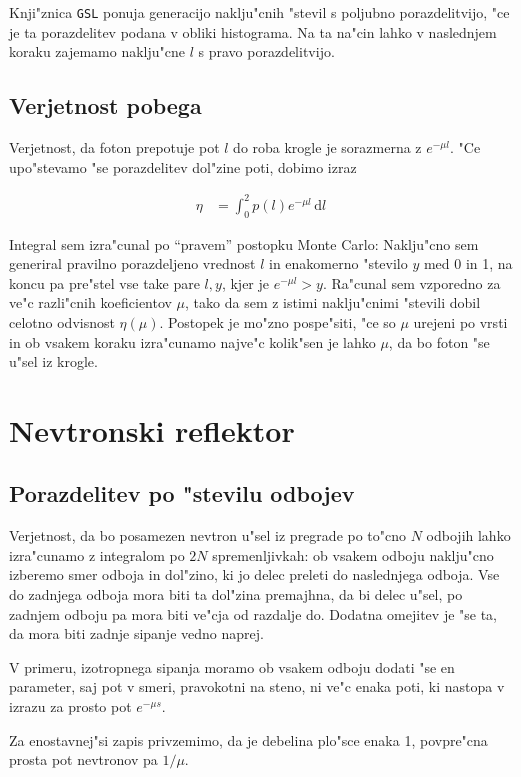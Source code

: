 \documentclass[a4paper,10pt]{article}
\newcommand{\dd}{\,\mathrm{d}}
\begin{document}
Knji"znica \texttt{GSL} ponuja generacijo naklju"cnih "stevil s poljubno porazdelitvijo, "ce je ta porazdelitev podana v obliki histograma. Na ta na"cin lahko v naslednjem koraku zajemamo naklju"cne $l$ s pravo porazdelitvijo. 

\subsection{Verjetnost pobega}
Verjetnost, da foton prepotuje pot $l$ do roba krogle je sorazmerna z $e^{-\mu l}$. "Ce upo"stevamo "se porazdelitev dol"zine poti, dobimo izraz

\begin{align}
 \eta &= \int_0^2 p(l) e^{-\mu l} \dd l
\end{align}
 
Integral sem izra"cunal po ``pravem'' postopku Monte Carlo: Naklju"cno sem generiral pravilno porazdeljeno vrednost $l$ in enakomerno "stevilo $y$ med 0 in 1, na koncu pa pre"stel vse take pare $l,y$, kjer je $e^{-\mu l} > y$. Ra"cunal sem vzporedno za ve"c razli"cnih koeficientov $\mu$, tako da sem z istimi naklju"cnimi "stevili dobil celotno odvisnost $\eta(\mu)$. Postopek je mo"zno pospe"siti, "ce so $\mu$ urejeni po vrsti in ob vsakem koraku izra"cunamo najve"c kolik"sen je lahko $\mu$, da bo foton "se u"sel iz krogle. 

\section{Nevtronski reflektor}

\subsection{Porazdelitev po "stevilu odbojev}

Verjetnost, da bo posamezen nevtron u"sel iz pregrade po to"cno $N$ odbojih lahko izra"cunamo z integralom po $2N$ spremenljivkah: ob vsakem odboju naklju"cno izberemo smer odboja in dol"zino, ki jo delec preleti do naslednjega odboja. Vse do zadnjega odboja mora biti ta dol"zina premajhna, da bi delec u"sel, po zadnjem odboju pa mora biti ve"cja od razdalje do. Dodatna omejitev je "se ta, da mora biti zadnje sipanje vedno naprej. 

V primeru, izotropnega sipanja moramo ob vsakem odboju dodati "se en parameter, saj pot v smeri, pravokotni na steno, ni ve"c enaka poti, ki nastopa v izrazu za prosto pot $e^{-\mu s}$. 

Za enostavnej"si zapis privzemimo, da je debelina plo"sce enaka 1, povpre"cna prosta pot nevtronov pa $1/\mu$. 
\end{document}
